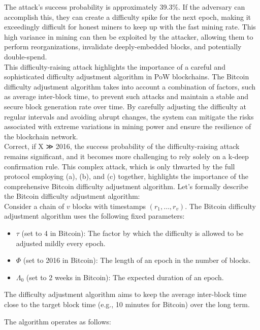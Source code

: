 \documentclass{report}
\begin{document}
The attack's success probability is approximately 39.3\%. If the adversary can accomplish this, they can create a difficulty spike for the next epoch, making it exceedingly difficult for honest miners to keep up with the fast mining rate. This high variance in mining can then be exploited by the attacker, allowing them to perform reorganizations, invalidate deeply-embedded blocks, and potentially double-spend.\\
This difficulty-raising attack highlights the importance of a careful and sophisticated difficulty adjustment algorithm in PoW blockchains. The Bitcoin difficulty adjustment algorithm takes into account a combination of factors, such as average inter-block time, to prevent such attacks and maintain a stable and secure block generation rate over time. By carefully adjusting the difficulty at regular intervals and avoiding abrupt changes, the system can mitigate the risks associated with extreme variations in mining power and ensure the resilience of the blockchain network.\\
Correct, if X ≫ 2016, the success probability of the difficulty-raising attack remains significant, and it becomes more challenging to rely solely on a k-deep confirmation rule. This complex attack, which is only thwarted by the full protocol employing (a), (b), and (c) together, highlights the importance of the comprehensive Bitcoin difficulty adjustment algorithm. Let's formally describe the Bitcoin difficulty adjustment algorithm:\\
Consider a chain of $v$ blocks with timestamps $(r_1, \ldots, r_v)$. The Bitcoin difficulty adjustment algorithm uses the following fixed parameters:

\begin{itemize}
	\item $\tau$ (set to 4 in Bitcoin): The factor by which the difficulty is allowed to be adjusted mildly every epoch.
	\item $\Phi$ (set to 2016 in Bitcoin): The length of an epoch in the number of blocks.
	\item $\Lambda_0$ (set to 2 weeks in Bitcoin): The expected duration of an epoch.
\end{itemize}

The difficulty adjustment algorithm aims to keep the average inter-block time close to the target block time (e.g., 10 minutes for Bitcoin) over the long term.

The algorithm operates as follows:
\end{document}
